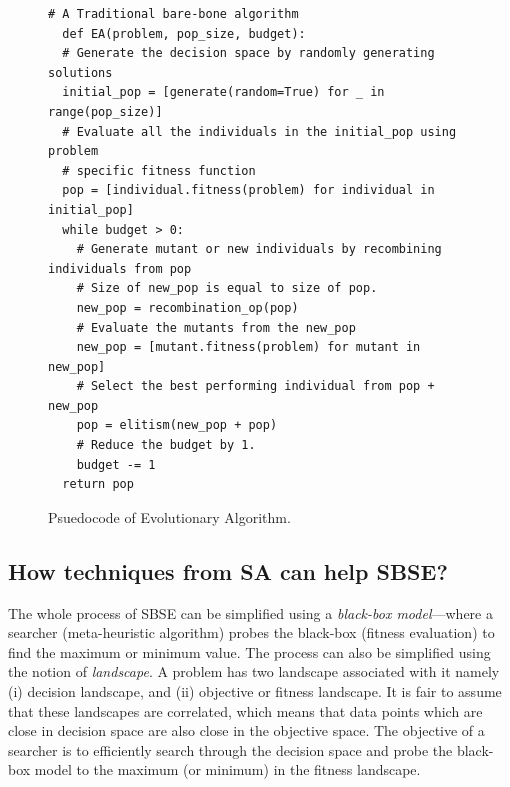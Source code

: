 \documentclass[table, xcdraw, sigconf,review, anonymous]{acmart}
\begin{document}
\begin{figure}[t]
\small
\hspace{0.4cm}\begin{lstlisting}[xrightmargin=5.0ex,mathescape,frame=none,numbers=right]
  # A Traditional bare-bone algorithm
  def EA(problem, pop_size, budget):
  # Generate the decision space by randomly generating solutions
  initial_pop = [generate(random=True) for _ in range(pop_size)]
  # Evaluate all the individuals in the initial_pop using problem 
  # specific fitness function
  pop = [individual.fitness(problem) for individual in initial_pop]
  while budget > 0:
    # Generate mutant or new individuals by recombining individuals from pop
    # Size of new_pop is equal to size of pop.
    new_pop = recombination_op(pop)
    # Evaluate the mutants from the new_pop
    new_pop = [mutant.fitness(problem) for mutant in new_pop]
    # Select the best performing individual from pop + new_pop
    pop = elitism(new_pop + pop)
    # Reduce the budget by 1. 
    budget -= 1
  return pop

\end{lstlisting}
\caption{\small{Psuedocode of Evolutionary Algorithm.}
}
\label{fig:EA}  
\end{figure}

\subsection{How techniques from SA can help SBSE?}\label{sec:help}

The whole process of SBSE can be simplified using a \textit{black-box model}---where a searcher (meta-heuristic algorithm) probes the black-box (fitness evaluation) to find the maximum or minimum value. The process can also be simplified using the notion of \textit{landscape}. A problem has two landscape associated with it namely (i) decision landscape, and (ii) objective or fitness landscape. It is fair to assume that these landscapes are correlated, which means that data points which are close in decision space are also close in the objective space. 
The objective of a searcher is to efficiently search through the decision space and probe the black-box model to the maximum (or minimum) in the fitness landscape.
\end{document}
